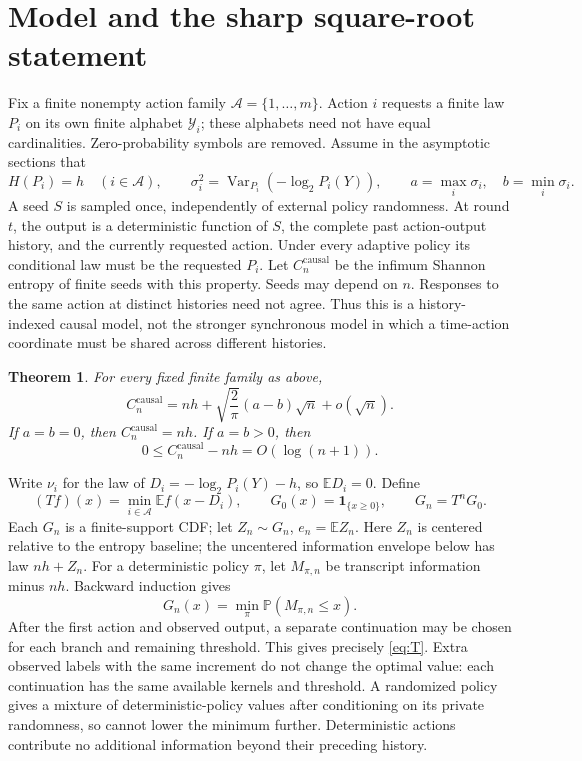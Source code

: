 \documentclass[11pt,a4paper]{article}
\newtheorem{theorem}{Theorem}
\newcommand{\E}{\mathbb E}
\newcommand{\Prob}{\mathbb P}
\newcommand{\causal}{\mathrm{causal}}
\begin{document}
\section{Model and the sharp square-root statement}\label{sec:model}
Fix a finite nonempty action family $\mathcal A=\{1,\ldots,m\}$.
Action $i$ requests a finite law $P_i$ on its own finite alphabet
$\mathcal Y_i$; these alphabets need not have equal cardinalities.
Zero-probability symbols are removed. Assume in the asymptotic sections that
\[
H(P_i)=h\quad(i\in\mathcal A),\qquad
\sigma_i^2=\operatorname{Var}_{P_i}(-\log_2P_i(Y)),\qquad
a=\max_i\sigma_i,\quad b=\min_i\sigma_i.
\]
A seed $S$ is sampled once, independently of external policy randomness.
At round $t$, the output is a deterministic function of $S$, the complete
past action-output history, and the currently requested action.
Under every adaptive policy its conditional law must be the requested
$P_i$. Let $C_n^{\causal}$ be the infimum Shannon entropy of finite seeds
with this property. Seeds may depend on $n$. Responses to the same action
at distinct histories need not agree. Thus this is a history-indexed
causal model, not the stronger synchronous model in which a time-action
coordinate must be shared across different histories.

\begin{theorem}\label{thm:main}
For every fixed finite family as above,
\begin{equation}\label{eq:main}
\boxed{C_n^{\causal}
=nh+\sqrt{\frac2\pi}(a-b)\sqrt n+o(\sqrt n).}
\end{equation}
If $a=b=0$, then $C_n^{\causal}=nh$. If $a=b>0$, then
\begin{equation}\label{eq:equalvar}
0\le C_n^{\causal}-nh=O(\log(n+1)).
\end{equation}
\end{theorem}
Write $\nu_i$ for the law of $D_i=-\log_2P_i(Y)-h$, so $\E D_i=0$.
Define
\begin{equation}\label{eq:T}
(Tf)(x)=\min_{i\in\mathcal A}\E f(x-D_i),\qquad
G_0(x)=\mathbf1_{\{x\ge0\}},\qquad G_n=T^nG_0.
\end{equation}
Each $G_n$ is a finite-support CDF; let $Z_n\sim G_n$, $e_n=\E Z_n$.
Here $Z_n$ is centered relative to the entropy baseline; the uncentered
information envelope below has law $nh+Z_n$.
For a deterministic policy $\pi$, let $M_{\pi,n}$ be transcript
information minus $nh$. Backward induction gives
\begin{equation}\label{eq:policy}
G_n(x)=\min_\pi\Prob(M_{\pi,n}\le x).
\end{equation}
After the first action and observed output, a separate continuation may
be chosen for each branch and remaining threshold. This gives precisely
\eqref{eq:T}. Extra observed labels with the same increment do not change
the optimal value: each continuation has the same available kernels and
threshold. A randomized policy gives a mixture of deterministic-policy
values after conditioning on its private randomness, so cannot lower
the minimum further. Deterministic actions contribute no additional
information beyond their preceding history.
\end{document}
